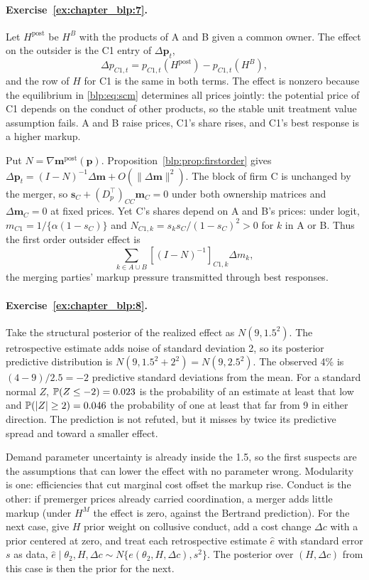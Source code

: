 \paragraph{Exercise~\ref{ex:chapter_blp:7}.} Let $H^{\mathrm{post}}$ be $H^B$ with the products of A and B given a common owner. The effect on the outsider is the C1 entry of $\Delta\bm p_t$,
\[
\Delta p_{C1,t}=p_{C1,t}(H^{\mathrm{post}})-p_{C1,t}(H^B),
\]
and the row of $H$ for C1 is the same in both terms. The effect is nonzero because the equilibrium in \eqref{blp:eq:scm} determines all prices jointly: the potential price of C1 depends on the conduct of other products, so the stable unit treatment value assumption fails. A and B raise prices, C1's share rises, and C1's best response is a higher markup.

Put $N = \nabla\bm m^{\mathrm{post}}(\bm p)$. Proposition~\ref{blp:prop:firstorder} gives $\Delta\bm p_t = (I-N)^{-1}\Delta\bm m + O(\lVert\Delta\bm m\rVert^2)$. The block of firm C is unchanged by the merger, so $\bm s_C + (D_p^\top)_{CC}\bm m_C = 0$ under both ownership matrices and $\Delta\bm m_C = 0$ at fixed prices. Yet C's shares depend on A and B's prices: under logit, $m_{C1} = 1/\{\alpha(1-s_C)\}$ and $N_{C1,k} = s_ks_C/(1-s_C)^2 > 0$ for $k$ in A or B. Thus the first order outsider effect is
\[
\sum_{k\in A\cup B}[(I-N)^{-1}]_{C1,k}\Delta m_k,
\]
the merging parties' markup pressure transmitted through best responses.

\paragraph{Exercise~\ref{ex:chapter_blp:8}.} Take the structural posterior of the realized effect as $N(9,1.5^2)$. The retrospective estimate adds noise of standard deviation 2, so its posterior predictive distribution is $N(9,1.5^2+2^2)=N(9,2.5^2)$. The observed 4\% is $(4-9)/2.5=-2$ predictive standard deviations from the mean. For a standard normal $Z$, $\mathbb{P}(Z\le-2)=0.023$ is the probability of an estimate at least that low and $\mathbb{P}(|Z|\ge2)=0.046$ the probability of one at least that far from 9 in either direction. The prediction is not refuted, but it misses by twice its predictive spread and toward a smaller effect.

Demand parameter uncertainty is already inside the 1.5, so the first suspects are the assumptions that can lower the effect with no parameter wrong. Modularity is one: efficiencies that cut marginal cost offset the markup rise. Conduct is the other: if premerger prices already carried coordination, a merger adds little markup (under $H^M$ the effect is zero, against the Bertrand prediction). For the next case, give $H$ prior weight on collusive conduct, add a cost change $\Delta c$ with a prior centered at zero, and treat each retrospective estimate $\hat e$ with standard error $s$ as data, $\hat e\mid\theta_2,H,\Delta c\sim N\{e(\theta_2,H,\Delta c),s^2\}$. The posterior over $(H,\Delta c)$ from this case is then the prior for the next.

